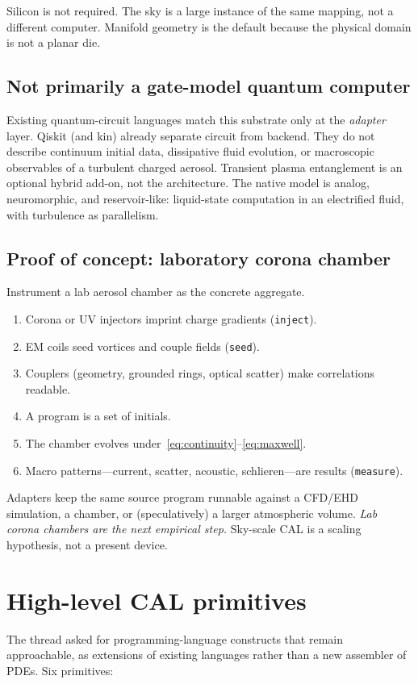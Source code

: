 \documentclass[11pt,a4paper]{article}
\begin{document}
Silicon is not required. The sky is a large instance of the same mapping, not a different computer. Manifold geometry is the default because the physical domain is not a planar die.

\subsection{Not primarily a gate-model quantum computer}
Existing quantum-circuit languages match this substrate only at the \emph{adapter} layer. Qiskit (and kin) already separate circuit from backend. They do not describe continuum initial data, dissipative fluid evolution, or macroscopic observables of a turbulent charged aerosol. Transient plasma entanglement is an optional hybrid add-on, not the architecture. The native model is analog, neuromorphic, and reservoir-like: liquid-state computation in an electrified fluid, with turbulence as parallelism.

\subsection{Proof of concept: laboratory corona chamber}
Instrument a lab aerosol chamber as the concrete aggregate.

\begin{enumerate}[leftmargin=1.4em]
\item Corona or UV injectors imprint charge gradients (\texttt{inject}).
\item EM coils seed vortices and couple fields (\texttt{seed}).
\item Couplers (geometry, grounded rings, optical scatter) make correlations readable.
\item A program is a set of initials.
\item The chamber evolves under~\eqref{eq:continuity}--\eqref{eq:maxwell}.
\item Macro patterns---current, scatter, acoustic, schlieren---are results (\texttt{measure}).
\end{enumerate}

Adapters keep the same source program runnable against a CFD/EHD simulation, a chamber, or (speculatively) a larger atmospheric volume. \emph{Lab corona chambers are the next empirical step.} Sky-scale CAL is a scaling hypothesis, not a present device.

\section{High-level CAL primitives}
The thread asked for programming-language constructs that remain approachable, as extensions of existing languages rather than a new assembler of PDEs. Six primitives:
\end{document}

